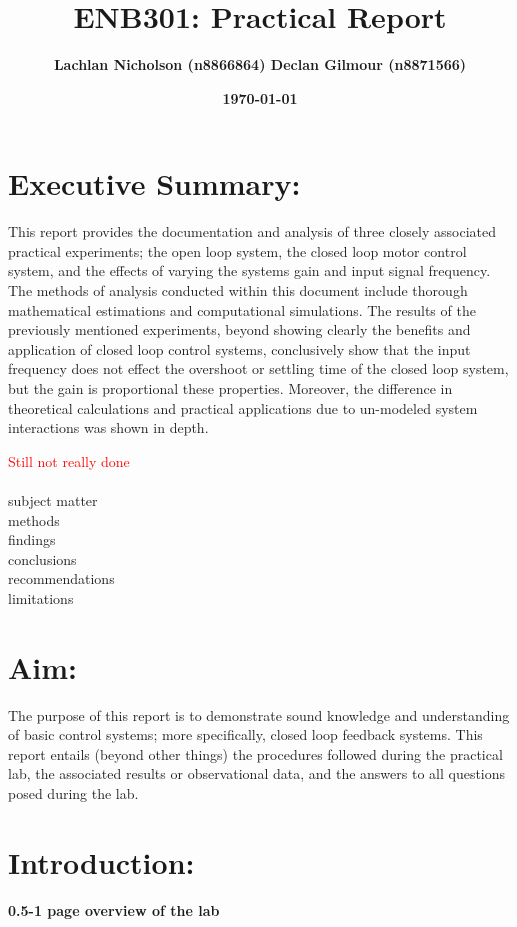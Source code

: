 \documentclass[11pt,a4paper]{article}
\title{\textbf{ENB301: Practical Report}}
\author{\textbf{Lachlan Nicholson (n8866864) Declan Gilmour (n8871566)}}
\date{\textbf{\today}}
\begin{document}
\maketitle

\section{Executive Summary:}
This report provides the documentation and analysis of three closely associated practical experiments; the open loop system, the closed loop motor control system, and the effects of varying the systems gain and input signal frequency. 
The methods of analysis conducted within this document include thorough mathematical estimations and computational simulations.
The results of the previously mentioned experiments, beyond showing clearly the benefits and application of closed loop control systems, conclusively show that the input frequency does not effect the overshoot or settling time of the closed loop system, but the gain is proportional these properties. Moreover, the difference in theoretical calculations and practical applications due to un-modeled system interactions was shown in depth.  

\textcolor{red}{Still not really done}\\\\
subject matter\\
methods\\
findings\\
conclusions\\
recommendations\\
limitations\\

\section{Aim:}
The purpose of this report is to demonstrate sound knowledge and understanding of basic control systems; more specifically, closed loop feedback systems. This report entails (beyond other things) the procedures followed during the practical lab, the associated results or observational data, and the answers to all questions posed during the lab.  

\section{Introduction:}
\textbf{0.5-1 page overview of the lab}\\
\end{document}
